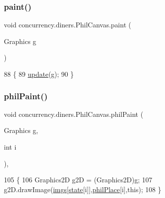 \mbox{\label{classconcurrency_1_1diners_1_1_phil_canvas_ae6c970b748039b6e92cdc49dcf5550e3}} 
\subsubsection{\texorpdfstring{paint()}{paint()}}
{\footnotesize\ttfamily void concurrency.\+diners.\+Phil\+Canvas.\+paint (\begin{DoxyParamCaption}\item[{Graphics}]{g }\end{DoxyParamCaption})\hspace{0.3cm}{\ttfamily [inline]}}


\begin{DoxyCode}
88                                   \{
89         \mbox{\hyperlink{classconcurrency_1_1diners_1_1_phil_canvas_a504bf6cf1499dcfb022344ca1991080f}{update}}(g);
90     \}
\end{DoxyCode}
\mbox{\label{classconcurrency_1_1diners_1_1_phil_canvas_a7355845d8b7bc65a0d12d154003bd8b4}} 
\subsubsection{\texorpdfstring{phil\+Paint()}{philPaint()}}
{\footnotesize\ttfamily void concurrency.\+diners.\+Phil\+Canvas.\+phil\+Paint (\begin{DoxyParamCaption}\item[{Graphics}]{g,  }\item[{int}]{i }\end{DoxyParamCaption})\hspace{0.3cm}{\ttfamily [inline]}, {\ttfamily [package]}}


\begin{DoxyCode}
105                                     \{
106         Graphics2D g2D = (Graphics2D)g;
107         g2D.drawImage(\mbox{\hyperlink{classconcurrency_1_1diners_1_1_phil_canvas_a107d0c96c4c1050eca2998d5ae198cea}{imgs}}[\mbox{\hyperlink{classconcurrency_1_1diners_1_1_phil_canvas_afe8fe2130ea9e415bdf1887ec73596c0}{state}}[i]],\mbox{\hyperlink{classconcurrency_1_1diners_1_1_phil_canvas_a7bc660c3c92202be5de56022e6c2cf41}{philPlace}}[i],\textcolor{keyword}{this});
108     \}
\end{DoxyCode}
\mbox{\label{classconcurrency_1_1diners_1_1_phil_canvas_a985316d908f267ebfe83d09c90e55e7a}} 
